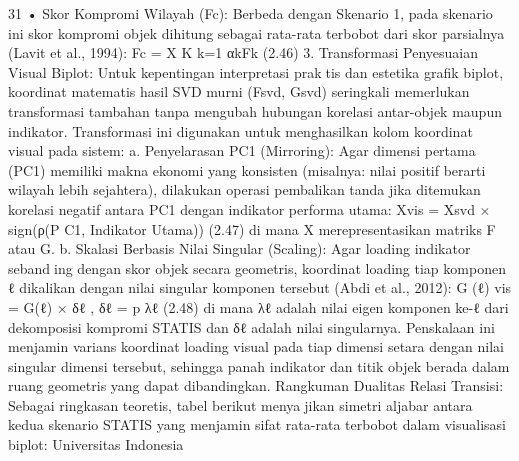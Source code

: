 31
• Skor Kompromi Wilayah (Fc): Berbeda dengan Skenario 1, pada skenario ini
skor kompromi objek dihitung sebagai rata-rata terbobot dari skor parsialnya
(Lavit et al., 1994):
Fc =
X
K
k=1
αkFk (2.46)
3. Transformasi Penyesuaian Visual Biplot: Untuk kepentingan interpretasi praktis dan estetika grafik biplot, koordinat matematis hasil SVD murni (Fsvd, Gsvd)
seringkali memerlukan transformasi tambahan tanpa mengubah hubungan korelasi
antar-objek maupun indikator. Transformasi ini digunakan untuk menghasilkan
kolom koordinat visual pada sistem:
a. Penyelarasan PC1 (Mirroring): Agar dimensi pertama (PC1) memiliki makna
ekonomi yang konsisten (misalnya: nilai positif berarti wilayah lebih sejahtera),
dilakukan operasi pembalikan tanda jika ditemukan korelasi negatif antara PC1
dengan indikator performa utama:
Xvis = Xsvd × sign(ρ(P C1, Indikator Utama)) (2.47)
di mana X merepresentasikan matriks F atau G.
b. Skalasi Berbasis Nilai Singular (Scaling): Agar loading indikator sebanding dengan skor objek secara geometris, koordinat loading tiap komponen ℓ
dikalikan dengan nilai singular komponen tersebut (Abdi et al., 2012):
G
(ℓ)
vis = G(ℓ) × δℓ
, δℓ =
p
λℓ (2.48)
di mana λℓ adalah nilai eigen komponen ke-ℓ dari dekomposisi kompromi
STATIS dan δℓ adalah nilai singularnya. Penskalaan ini menjamin varians
koordinat loading visual pada tiap dimensi setara dengan nilai singular dimensi
tersebut, sehingga panah indikator dan titik objek berada dalam ruang geometris
yang dapat dibandingkan.
Rangkuman Dualitas Relasi Transisi: Sebagai ringkasan teoretis, tabel berikut menyajikan simetri aljabar antara kedua skenario STATIS yang menjamin sifat rata-rata terbobot
dalam visualisasi biplot:
Universitas Indonesia

